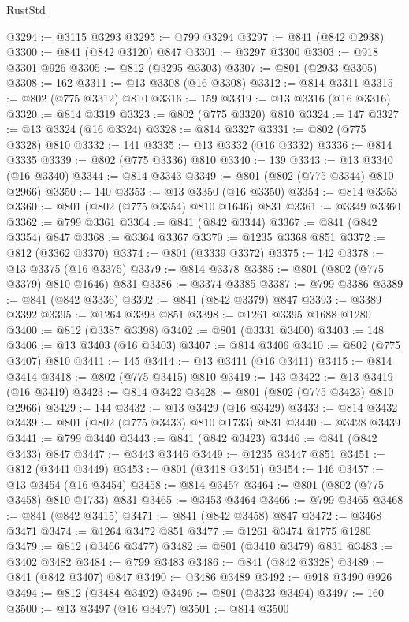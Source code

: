 \begin{lexlean}{RustStd}
\begin{coremodule}
{\begin{coremodule}
{{{{{@3294 := @3115 @3293
@3295 := @799 @3294
@3297 := @841 (@842 @2938)
@3300 := @841 (@842 @3120) @847
@3301 := @3297 @3300
@3303 := @918 @3301 @926
@3305 := @812 (@3295 @3303)
@3307 := @801 (@2933 @3305)
@3308 := 162
@3311 := @13 @3308 (@16 @3308)
@3312 := @814 @3311
@3315 := @802 (@775 @3312) @810
@3316 := 159
@3319 := @13 @3316 (@16 @3316)
@3320 := @814 @3319
@3323 := @802 (@775 @3320) @810
@3324 := 147
@3327 := @13 @3324 (@16 @3324)
@3328 := @814 @3327
@3331 := @802 (@775 @3328) @810
@3332 := 141
@3335 := @13 @3332 (@16 @3332)
@3336 := @814 @3335
@3339 := @802 (@775 @3336) @810
@3340 := 139
@3343 := @13 @3340 (@16 @3340)
@3344 := @814 @3343
@3349 := @801 (@802 (@775 @3344) @810 @2966)
@3350 := 140
@3353 := @13 @3350 (@16 @3350)
@3354 := @814 @3353
@3360 := @801 (@802 (@775 @3354) @810 @1646) @831
@3361 := @3349 @3360
@3362 := @799 @3361
@3364 := @841 (@842 @3344)
@3367 := @841 (@842 @3354) @847
@3368 := @3364 @3367
@3370 := @1235 @3368 @851
@3372 := @812 (@3362 @3370)
@3374 := @801 (@3339 @3372)
@3375 := 142
@3378 := @13 @3375 (@16 @3375)
@3379 := @814 @3378
@3385 := @801 (@802 (@775 @3379) @810 @1646) @831
@3386 := @3374 @3385
@3387 := @799 @3386
@3389 := @841 (@842 @3336)
@3392 := @841 (@842 @3379) @847
@3393 := @3389 @3392
@3395 := @1264 @3393 @851
@3398 := @1261 @3395 @1688 @1280
@3400 := @812 (@3387 @3398)
@3402 := @801 (@3331 @3400)
@3403 := 148
@3406 := @13 @3403 (@16 @3403)
@3407 := @814 @3406
@3410 := @802 (@775 @3407) @810
@3411 := 145
@3414 := @13 @3411 (@16 @3411)
@3415 := @814 @3414
@3418 := @802 (@775 @3415) @810
@3419 := 143
@3422 := @13 @3419 (@16 @3419)
@3423 := @814 @3422
@3428 := @801 (@802 (@775 @3423) @810 @2966)
@3429 := 144
@3432 := @13 @3429 (@16 @3429)
@3433 := @814 @3432
@3439 := @801 (@802 (@775 @3433) @810 @1733) @831
@3440 := @3428 @3439
@3441 := @799 @3440
@3443 := @841 (@842 @3423)
@3446 := @841 (@842 @3433) @847
@3447 := @3443 @3446
@3449 := @1235 @3447 @851
@3451 := @812 (@3441 @3449)
@3453 := @801 (@3418 @3451)
@3454 := 146
@3457 := @13 @3454 (@16 @3454)
@3458 := @814 @3457
@3464 := @801 (@802 (@775 @3458) @810 @1733) @831
@3465 := @3453 @3464
@3466 := @799 @3465
@3468 := @841 (@842 @3415)
@3471 := @841 (@842 @3458) @847
@3472 := @3468 @3471
@3474 := @1264 @3472 @851
@3477 := @1261 @3474 @1775 @1280
@3479 := @812 (@3466 @3477)
@3482 := @801 (@3410 @3479) @831
@3483 := @3402 @3482
@3484 := @799 @3483
@3486 := @841 (@842 @3328)
@3489 := @841 (@842 @3407) @847
@3490 := @3486 @3489
@3492 := @918 @3490 @926
@3494 := @812 (@3484 @3492)
@3496 := @801 (@3323 @3494)
@3497 := 160
@3500 := @13 @3497 (@16 @3497)
@3501 := @814 @3500
}}}}}
\end{coremodule}}
\end{coremodule}
\end{lexlean}
